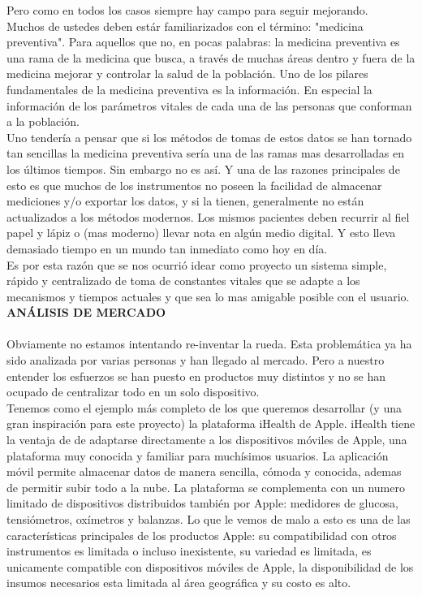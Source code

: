 \documentclass[11pt]{report}
\begin{document}
Pero como en todos los casos siempre hay campo para seguir mejorando.\\

Muchos de ustedes deben estár familiarizados con el término: "medicina preventiva". Para aquellos que no, en pocas palabras: la medicina preventiva es una rama de la medicina que busca, a través de muchas áreas dentro y fuera de la medicina mejorar y controlar la salud de la población. Uno de los pilares fundamentales de la medicina preventiva es la información. En especial la información de los parámetros vitales de cada una de las personas que conforman a la población.\\

Uno tendería a pensar que si los métodos de tomas de estos datos se han tornado tan sencillas la medicina preventiva sería una de las ramas mas desarrolladas en los últimos tiempos. Sin embargo no es así. Y una de las razones principales de esto es que muchos de los instrumentos no poseen la facilidad de almacenar mediciones y/o exportar
los datos, y si la tienen, generalmente  no están actualizados a los métodos modernos.
Los mismos pacientes deben recurrir al fiel papel y lápiz o (mas moderno) llevar nota en algún medio digital. Y esto lleva demasiado tiempo en un mundo tan inmediato como hoy en día.\\

Es por esta razón que se nos ocurrió idear como proyecto un sistema simple, rápido y centralizado de toma de constantes vitales que se adapte a los mecanismos y tiempos actuales y que sea lo mas amigable posible con el usuario.\\


\newpage
\noindent \Large \textbf{ANÁLISIS DE MERCADO} \\
\\

Obviamente no estamos intentando re-inventar la rueda. Esta problemática ya ha sido analizada por varias personas y han llegado al mercado. Pero a nuestro entender los esfuerzos se han puesto en productos muy distintos y no se han ocupado de centralizar todo en un solo dispositivo.\\

Tenemos como el ejemplo más completo de los que queremos desarrollar (y una gran inspiración para este proyecto) la plataforma iHealth de Apple. iHealth tiene la ventaja de de adaptarse directamente a los dispositivos móviles de Apple, una plataforma muy conocida y familiar para muchísimos usuarios. La aplicación móvil permite almacenar datos de manera sencilla, cómoda y conocida, ademas de permitir subir todo a la nube. La plataforma se complementa con un numero limitado de dispositivos distribuidos también por Apple: medidores de glucosa, tensiómetros, oxímetros y
balanzas. Lo que le vemos de malo a esto es una de las características principales de los productos Apple: su compatibilidad con otros instrumentos es limitada o incluso inexistente, su variedad es limitada, es unicamente compatible con dispositivos móviles de Apple, la disponibilidad de los insumos necesarios esta limitada al área geográfica y su costo es alto.\\
\end{document}
